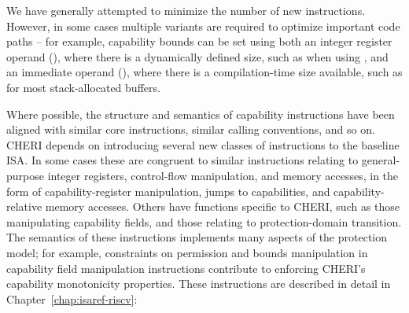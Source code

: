 We have generally attempted to minimize the number of new instructions.
However, in some cases multiple variants are required to optimize important
code paths -- for example, capability bounds can be set using both an integer register
operand (), where there is a dynamically defined
size, such as when using , and an immediate operand
(), where there is a compilation-time size
available, such as for most stack-allocated buffers.

Where possible, the structure and semantics of capability instructions have been
aligned with similar core instructions, similar calling conventions, and so on.
CHERI depends on introducing several new classes of instructions to the
baseline ISA.
In some cases these are congruent to similar instructions relating to
general-purpose integer registers, control-flow manipulation, and memory
accesses, in the form of capability-register manipulation, jumps to
capabilities, and capability-relative memory accesses.
Others have functions specific to CHERI, such as those manipulating capability
fields, and those relating to protection-domain transition.
The semantics of these instructions implements many aspects of the protection
model; for example, constraints on permission and bounds manipulation in
capability field manipulation instructions contribute to enforcing CHERI's
capability monotonicity properties.
These instructions are described in detail in Chapter~\ref{chap:isaref-riscv}:

